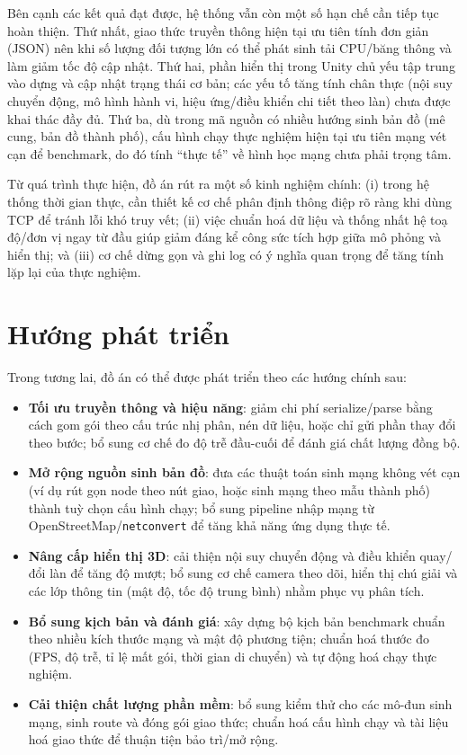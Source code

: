 \documentclass[../DoAn.tex]{subfiles}
\begin{document}
Bên cạnh các kết quả đạt được, hệ thống vẫn còn một số hạn chế cần tiếp tục hoàn thiện. Thứ nhất, giao thức truyền thông hiện tại ưu tiên tính đơn giản (JSON) nên khi số lượng đối tượng lớn có thể phát sinh tải CPU/băng thông và làm giảm tốc độ cập nhật. Thứ hai, phần hiển thị trong Unity chủ yếu tập trung vào dựng và cập nhật trạng thái cơ bản; các yếu tố tăng tính chân thực (nội suy chuyển động, mô hình hành vi, hiệu ứng/điều khiển chi tiết theo làn) chưa được khai thác đầy đủ. Thứ ba, dù trong mã nguồn có nhiều hướng sinh bản đồ (mê cung, bản đồ thành phố), cấu hình chạy thực nghiệm hiện tại ưu tiên mạng vét cạn để benchmark, do đó tính ``thực tế'' về hình học mạng chưa phải trọng tâm.

Từ quá trình thực hiện, đồ án rút ra một số kinh nghiệm chính: (i) trong hệ thống thời gian thực, cần thiết kế cơ chế phân định thông điệp rõ ràng khi dùng TCP để tránh lỗi khó truy vết; (ii) việc chuẩn hoá dữ liệu và thống nhất hệ toạ độ/đơn vị ngay từ đầu giúp giảm đáng kể công sức tích hợp giữa mô phỏng và hiển thị; và (iii) cơ chế dừng gọn và ghi log có ý nghĩa quan trọng để tăng tính lặp lại của thực nghiệm.

\section{Hướng phát triển}
Trong tương lai, đồ án có thể được phát triển theo các hướng chính sau:
\begin{itemize}[leftmargin=2em]
	\item \textbf{Tối ưu truyền thông và hiệu năng}: giảm chi phí serialize/parse bằng cách gom gói theo cấu trúc nhị phân, nén dữ liệu, hoặc chỉ gửi phần thay đổi theo bước; bổ sung cơ chế đo độ trễ đầu-cuối để đánh giá chất lượng đồng bộ.
	\item \textbf{Mở rộng nguồn sinh bản đồ}: đưa các thuật toán sinh mạng không vét cạn (ví dụ rút gọn node theo nút giao, hoặc sinh mạng theo mẫu thành phố) thành tuỳ chọn cấu hình chạy; bổ sung pipeline nhập mạng từ OpenStreetMap/\texttt{netconvert} để tăng khả năng ứng dụng thực tế.
	\item \textbf{Nâng cấp hiển thị 3D}: cải thiện nội suy chuyển động và điều khiển quay/đổi làn để tăng độ mượt; bổ sung cơ chế camera theo dõi, hiển thị chú giải và các lớp thông tin (mật độ, tốc độ trung bình) nhằm phục vụ phân tích.
	\item \textbf{Bổ sung kịch bản và đánh giá}: xây dựng bộ kịch bản benchmark chuẩn theo nhiều kích thước mạng và mật độ phương tiện; chuẩn hoá thước đo (FPS, độ trễ, tỉ lệ mất gói, thời gian di chuyển) và tự động hoá chạy thực nghiệm.
	\item \textbf{Cải thiện chất lượng phần mềm}: bổ sung kiểm thử cho các mô-đun sinh mạng, sinh route và đóng gói giao thức; chuẩn hoá cấu hình chạy và tài liệu hoá giao thức để thuận tiện bảo trì/mở rộng.
\end{itemize}
\end{document}
